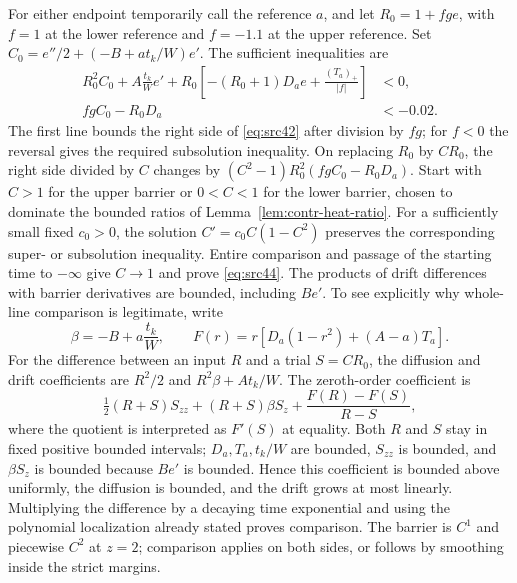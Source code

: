 \documentclass[11pt,a4paper]{article}
\numberwithin{equation}{section}
\theoremstyle{definition}
\theoremstyle{remark}
\begin{document}
For either endpoint temporarily call the reference $a$, and let
$R_0=1+fge$, with $f=1$ at the lower reference and $f=-1.1$ at the
upper reference.  Set
$C_0=e''/2+(-B+at_k/W)e'$.  The sufficient inequalities are
\begin{equation}
 \begin{split}
 R_0^2C_0+A\frac{t_k}{W}e'
  +R_0\left[-(R_0+1)D_ae+\frac{(T_a)_+}{|f|}\right]&<0,\\
 fgC_0-R_0D_a&<-0.02.
 \end{split}
 \label{eq:src45}
\end{equation}
The first line bounds the right side of \eqref{eq:src42} after
division by $fg$; for $f<0$ the reversal gives the required
subsolution inequality.  On replacing $R_0$ by $CR_0$, the right side
divided by $C$ changes by
$(C^2-1)R_0^2(fgC_0-R_0D_a)$.
Start with $C>1$ for the upper barrier or $0<C<1$ for the lower
barrier, chosen to dominate the bounded ratios of
Lemma~\ref{lem:contr-heat-ratio}.  For a sufficiently small fixed
$c_0>0$, the solution $C'=c_0C(1-C^2)$ preserves the corresponding
super- or subsolution inequality.  Entire comparison and passage of
the starting time to $-\infty$ give $C\to1$ and prove
\eqref{eq:src44}.  The products of drift differences with barrier
derivatives are bounded, including $Be'$.  To see explicitly why
whole-line comparison is legitimate, write
\[
 \beta=-B+a\frac{t_k}{W},\qquad
 F(r)=r[D_a(1-r^2)+(A-a)T_a].
\]
For the difference between an input $R$ and a trial $S=CR_0$,
the diffusion and drift coefficients are $R^2/2$ and
$R^2\beta+At_k/W$.  The zeroth-order coefficient is
\[
 \tfrac12(R+S)S_{zz}+(R+S)\beta S_z
       +\frac{F(R)-F(S)}{R-S},
\]
where the quotient is interpreted as $F'(S)$ at equality.
Both $R$ and $S$ stay in fixed positive bounded intervals;
$D_a,T_a,t_k/W$ are bounded, $S_{zz}$ is bounded, and
$\beta S_z$ is bounded because $Be'$ is bounded.  Hence this
coefficient is bounded above uniformly, the diffusion is bounded,
and the drift grows at most linearly.  Multiplying the difference
by a decaying time exponential and using the polynomial localization
already stated proves comparison.  The barrier is $C^1$ and
piecewise $C^2$ at $z=2$; comparison applies on both sides, or follows
by smoothing inside the strict margins.
\end{document}
